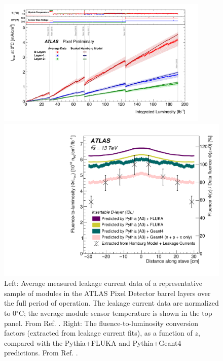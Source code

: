 \begin{figure}[!htb]
\centering
\begin{minipage}[t]{0.6\textwidth}
\vspace{0.25cm}
\includegraphics[width=0.9\textwidth]{figures/SensorSimulation/ileak_fig_01.pdf}
\end{minipage}
\begin{minipage}[t]{0.37\textwidth}
\vspace{-0.44cm}
\includegraphics[width=1.\textwidth]{figures/SensorSimulation/arXivversion_fig_03.pdf}
\end{minipage}
\caption{Left: Average measured leakage current data of a representative sample of modules in the ATLAS Pixel Detector barrel layers over the full period of operation. The leakage current data are normalized to 0$^{\circ}$C; the average module sensor temperature is shown in the top panel. From Ref. \cite{PixelLumiAndLeak}. Right: The fluence-to-luminosity conversion factors (extracted from leakage current fits), as a function of $z$, compared with the Pythia+FLUKA and Pythia+Geant4 predictions. From Ref. \cite{Aaboud:2019wgd}.}
\label{fig:FluenceLeak}
\end{figure}


